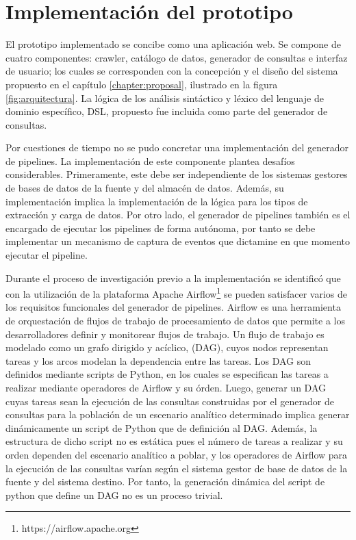\section{Implementación del prototipo}\label{section:prototype}

El prototipo implementado se concibe como una aplicación web. Se compone de cuatro componentes: crawler, catálogo de datos, generador de consultas 
e interfaz de usuario; los cuales se corresponden con la concepción y el diseño del sistema propuesto en el capítulo \ref{chapter:proposal}, 
ilustrado en la figura \ref{fig:arquitectura}. 
La lógica de los análisis sintáctico y léxico del lenguaje de dominio específico, DSL, propuesto fue incluida como parte 
del generador de consultas. 

Por cuestiones de tiempo no se pudo concretar una implementación del generador de pipelines. 
La implementación de este componente plantea desafíos considerables. Primeramente, 
este debe ser independiente de los sistemas gestores de bases de datos de la fuente y del almacén de datos. 
Además, su implementación implica la implementación de la lógica para los tipos de extracción y carga de datos. 
Por otro lado, el generador de pipelines también es el encargado de ejecutar los pipelines de forma autónoma, 
por tanto se debe implementar un mecanismo de captura de eventos que dictamine en que momento ejecutar el pipeline.

Durante el proceso de investigación previo a la implementación se identificó que con la utilización de la  
plataforma Apache Airflow\footnote{https://airflow.apache.org} se pueden satisfacer varios de los 
requisitos funcionales del generador de pipelines. Airflow es una herramienta de orquestación de flujos de 
trabajo de procesamiento de datos que permite a los desarrolladores definir y monitorear flujos de trabajo. 
Un flujo de trabajo es modelado como un grafo dirigido y ac\'iclico, (DAG), cuyos nodos representan tareas y los 
arcos modelan la dependencia entre las tareas. Los DAG son definidos mediante scripts de Python, en los cuales 
se especifican las tareas a realizar mediante operadores de Airflow y su \'orden. Luego, generar un DAG 
cuyas tareas sean la ejecución de las consultas construidas por el generador de consultas para la población de 
un escenario analítico determinado implica generar 
din\'amicamente un script de Python que de definición al DAG. Además, la estructura de dicho script 
no es estática pues el n\'umero de tareas a realizar y su orden dependen del escenario analítico a poblar,
y los operadores de Airflow para la ejecución de las consultas varían según el sistema gestor de base de 
datos de la fuente y del sistema destino. Por tanto, la generación dinámica del script de python que define un DAG 
no es un proceso trivial.

